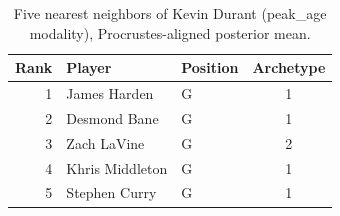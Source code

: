 \begin{table}[htbp]
  \centering\small
  \begin{tabular}{rllc}
    \toprule
    Rank & Player & Position & Archetype \\
    \midrule
    1 & James Harden & G & 1 \\
    2 & Desmond Bane & G & 1 \\
    3 & Zach LaVine & G & 2 \\
    4 & Khris Middleton & G & 1 \\
    5 & Stephen Curry & G & 1 \\
    \bottomrule
  \end{tabular}
  \caption{Five nearest neighbors of Kevin Durant (peak_age modality), Procrustes-aligned posterior mean.}
  \label{tab:Kevin_Durant_neighbors_peak_age}
\end{table}

